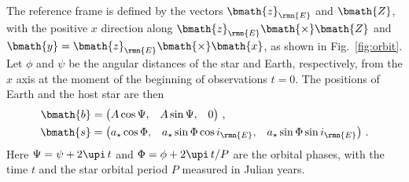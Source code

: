 \documentclass[fleqn,usenatbib,useAMS,usedcolumn]{mnras}
\begin{document}
The reference frame is defined by the vectors $\bmath{z}_\rmn{E}$ and $\bmath{Z}$, with the positive $x$ direction along $\bmath{z}_\rmn{E}\bmath{\times}\bmath{Z}$ and  $\bmath{y}=\bmath{z}_\rmn{E}\bmath{\times}\bmath{x}$, as shown in Fig.~\ref{fig:orbit}. Let $\phi$ and $\psi$ be the angular distances of the star and Earth, respectively, from the $x$ axis at the moment of the beginning of observations $t=0$. The positions of Earth and the host star are then
\begin{align}
 \bmath{b}&=
 \begin{pmatrix}
    A\cos\Psi, &
    A\sin\Psi, &
    0
 \end{pmatrix}\,,\label{eq:b}\\
 \bmath{s}&=
 \begin{pmatrix}
    a_\star\cos\Phi, &
    a_\star\sin\Phi\cos i_\rmn{E}, &
    a_\star\sin\Phi\sin i_\rmn{E}
 \end{pmatrix}\,.\label{eq:s}
\end{align}
Here $\Psi=\psi+2\upi\,t$ and $\Phi=\phi+2\upi\,t/P$ are the orbital phases, with the time $t$ and the star orbital period $P$ measured in Julian years.
\end{document}
